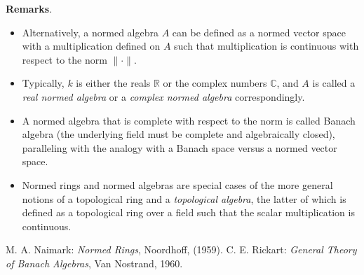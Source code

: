 \documentclass[12pt]{article}
\begin{document}
\textbf{Remarks}.  
\begin{itemize}
\item Alternatively, a normed algebra $A$ can be defined as a normed vector space with a multiplication defined on $A$ such that multiplication is continuous with respect to the norm $\|\cdot\|$.
\item Typically, $k$ is either the reals $\mathbb{R}$ or the complex numbers $\mathbb{C}$, and $A$ is called a \emph{real normed algebra} or a \emph{complex normed algebra} correspondingly.
\item A normed algebra that is complete with respect to the norm is called Banach algebra (the underlying field must be complete and algebraically closed), paralleling with the analogy with a Banach space versus a normed vector space.
\item Normed rings and normed algebras are special cases of the more general notions of a topological ring and a \emph{topological algebra}, the latter of which is defined as a topological ring over a field such that the scalar multiplication is continuous.
\end{itemize}

\begin{thebibliography}{7}
 M. A. Naimark: {\em Normed Rings}, Noordhoff, (1959).
 C. E. Rickart: {\em General Theory of Banach Algebras}, Van Nostrand, 1960.
\end{thebibliography}
\end{document}
